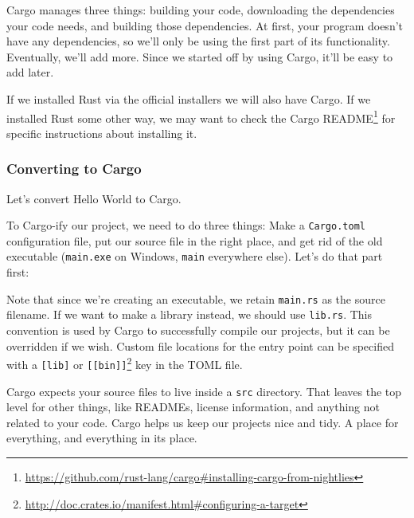 \documentclass[a4paper,]{book}
\newenvironment{Shaded}{\begin{snugshade}}{\end{snugshade}}
\newcommand{\KeywordTok}[1]{\textcolor[rgb]{0.13,0.29,0.53}{\textbf{{#1}}}}
\newcommand{\CommentTok}[1]{\textcolor[rgb]{0.56,0.35,0.01}{\textit{{#1}}}}
\newcommand{\NormalTok}[1]{{#1}}
\renewcommand{\href}[2]{#2\footnote{\url{#1}}}
\begin{document}
Cargo manages three things: building your code, downloading the
dependencies your code needs, and building those dependencies. At first,
your program doesn't have any dependencies, so we'll only be using the
first part of its functionality. Eventually, we'll add more. Since we
started off by using Cargo, it'll be easy to add later.

If we installed Rust via the official installers we will also have
Cargo. If we installed Rust some other way, we may want to
\href{https://github.com/rust-lang/cargo\#installing-cargo-from-nightlies}{check
the Cargo README} for specific instructions about installing it.

\subsubsection{Converting to Cargo}\label{converting-to-cargo}

Let's convert Hello World to Cargo.

To Cargo-ify our project, we need to do three things: Make a
\texttt{Cargo.toml} configuration file, put our source file in the right
place, and get rid of the old executable (\texttt{main.exe} on Windows,
\texttt{main} everywhere else). Let's do that part first:

\begin{Shaded}
\end{Shaded}

Note that since we're creating an executable, we retain \texttt{main.rs}
as the source filename. If we want to make a library instead, we should
use \texttt{lib.rs}. This convention is used by Cargo to successfully
compile our projects, but it can be overridden if we wish. Custom file
locations for the entry point can be specified with a
\href{http://doc.crates.io/manifest.html\#configuring-a-target}{\texttt{{[}lib{]}}
or \texttt{{[}{[}bin{]}{]}}} key in the TOML file.

Cargo expects your source files to live inside a \texttt{src} directory.
That leaves the top level for other things, like READMEs, license
information, and anything not related to your code. Cargo helps us keep
our projects nice and tidy. A place for everything, and everything in
its place.
\end{document}
